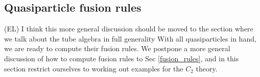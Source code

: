 \documentclass[12pt,a4paper]{article}
\newcommand{\tp}{\otimes}
\newcommand\be            {\begin{equation}}
\newcommand\ee            {\end{equation}}
\newcommand{\kw}[1]{{\color{kwcolor}\footnotesize{(KW) #1}}}
\newcommand{\ethan}[1]{{\color{amethyst}\footnotesize{(EL) #1}}}
\begin{document}

\subsection{Quasiparticle fusion rules} \label{C2_fusion_rules}
\ethan{I think this more general discussion should be moved to the section where we talk about the tube algebra in full generality}
With all quasiparticles in hand, we are ready to compute their fusion rules. 
We postpone a more general discussion of how to compute fusion rules to Sec \ref{fusion_rules}, and in this section restrict ourselves to working out examples for the $C_2$ theory. 
\end{document}
